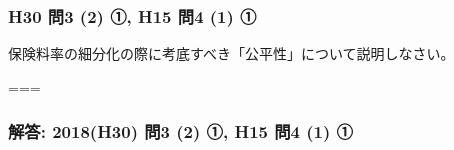 \documentclass[]{article}
\begin{document}
\hypertarget{h30-ux554f3-2-ux2460-h15-ux554f4-1-ux2460}{%
\subsubsection{H30 問3 (2) ①, H15 問4 (1)
①}\label{h30-ux554f3-2-ux2460-h15-ux554f4-1-ux2460}}

保険料率の細分化の際に考底すべき「公平性」について説明しなさい。

===

\hypertarget{ux89e3ux7b54-2018h30-ux554f3-2-ux2460-h15-ux554f4-1-ux2460}{%
\subsubsection{解答: 2018(H30) 問3 (2) ①, H15 問4 (1)
①}\label{ux89e3ux7b54-2018h30-ux554f3-2-ux2460-h15-ux554f4-1-ux2460}}
\end{document}
